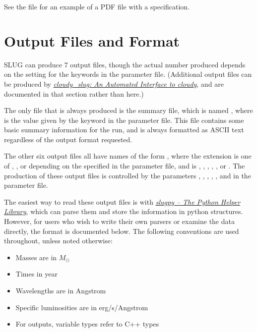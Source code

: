 \documentclass[letterpaper,10pt,english]{sphinxmanual}
\begin{document}
See the file  for an example of a PDF file with a  specification.


\chapter{Output Files and Format}
\label{output:output-files-and-format}\label{output::doc}\label{output:sec-output}
SLUG can produce 7 output files, though the actual number produced depends on the setting for the  keywords in the parameter file. (Additional output files can be produced by {\hyperref[cloudy:sec-cloudy-slug]{\emph{cloudy\_slug: An Automated Interface to cloudy}}}, and are documented in that section rather than here.)

The only file that is always produced is the summary file, which is named , where  is the value given by the  keyword in the parameter file. This file contains some basic summary information for the run, and is always formatted as ASCII text regardless of the output format requested.

The other six output files all have names of the form , where the extension  is one of , , or  depending on the  specified in the parameter file, and  is , , , , , or . The production of these output files is controlled by the parameters , , , , , and  in the parameter file.

The easiest way to read these output files is with {\hyperref[slugpy:sec-slugpy]{\emph{slugpy -- The Python Helper Library}}}, which can parse them and store the information in python structures. However, for users who wish to write their own parsers or examine the data directly, the format is documented below. The following conventions are used throughout, unless noted otherwise:
\begin{itemize}
\item {} 
Masses are in \(M_\odot\)

\item {} 
Times in year

\item {} 
Wavelengths are in Angstrom

\item {} 
Specific luminosities are in erg/s/Angstrom

\item {} 
For  outputs, variable types refer to C++ types

\end{itemize}
\end{document}
